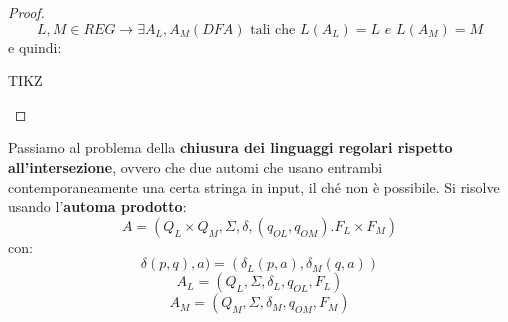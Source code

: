 \begin{proof}
	$$L,M\in REG\to \exists A_L,A_M(DFA) \mbox{ tali che }L(A_L)=L\,\,e\,\, L(A_M)=M$$
	e quindi:
	\begin{center}
		TIKZ
	\end{center}
\end{proof}
Passiamo al problema della \textbf{chiusura dei linguaggi regolari rispetto all'intersezione}, ovvero che due automi che usano entrambi contemporaneamente una certa stringa in input, il ché non è possibile. Si risolve usando l'\textbf{automa prodotto}:
$$A=(Q_L\times Q_M,\Sigma, \delta, (q_{OL},q_{OM}).F_L\times F_M)$$
con:
$$\delta(p,q),a)=(\delta_L(p,a),\delta_M(q,a))$$
$$A_L=(Q_L,\Sigma,\delta_L,q_{OL},F_L)$$
$$A_M=(Q_M,\Sigma,\delta_M,q_{OM},F_M)$$
